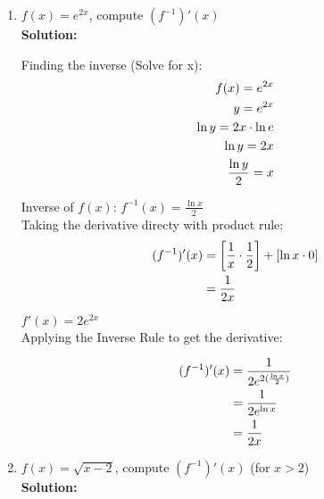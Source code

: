 \documentclass[a4paper]{article}
\begin{document}
\begin{enumerate}
\begin{enumerate}
	\item $f(x) = e^{2x}$, compute $(f^{-1})'(x)$\\
	\textbf{Solution:}\\
	
	
	
	
Finding the inverse (Solve for x):\\

\begin{align*}
	f(x) = e^{2x}\notag\\
	y = e^{2x}\notag\\
	\ln y = 2x \cdot \ln e\notag\\
	\ln y = 2x\notag\\
	\frac{\ln y}{2} = x\notag
\end{align*}	

Inverse of $f(x)$: $f^{-1}(x) = \frac{\ln x}{2}$\\
Taking the derivative directy with product rule:\\

\begin{align*}
 (f^{-1})'(x) &= \left[ \frac{1}{x} \cdot \frac{1}{2}\right] + \left[ \ln x \cdot 0 \right]\notag\\
 &= \frac{1}{2x}\notag
\end{align*}




$f'(x) = 2e^{2x}$\\	

Applying the Inverse Rule to get the derivative:

\begin{align}
	(f^{-1})'(x) &= \frac{1}{2e^{2(\frac{\ln x}{2})}}\notag\\
	&= \frac{1}{2e^{\ln x}}\notag\\
	&= \frac{1}{2x}\notag
\end{align}
	
	
	\item $f(x) = \sqrt{x - 2}$, compute $(f^{-1})'(x)$ (for $x > 2$)\\
	\textbf{Solution:}\\
	

\end{enumerate}
\end{enumerate}
\end{document}
